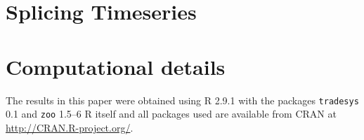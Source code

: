 \documentclass[a4]{article}
\newcommand{\code}[1]{\texttt{#1}}
\begin{document}
\section{Splicing Timeseries}

\section*{Computational details}
The results in this paper were obtained using R
2.9.1 with the packages
\code{tradesys} 0.1 
and \code{zoo}  1.5--6 R itself
and all packages used are available from CRAN at
\url{http://CRAN.R-project.org/}.
\end{document}
